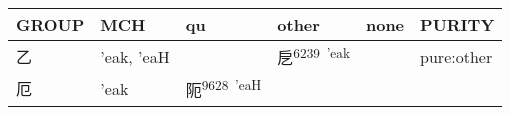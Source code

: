 \documentclass[14pt,a4paper]{scrartcl}
\begin{document}
\begin{longtable}[c]{@{}llllll@{}}
\toprule
\begin{minipage}[b]{0.14\columnwidth}\raggedright\strut
GROUP
\strut\end{minipage} &
\begin{minipage}[b]{0.14\columnwidth}\raggedright\strut
MCH
\strut\end{minipage} &
\begin{minipage}[b]{0.14\columnwidth}\raggedright\strut
qu
\strut\end{minipage} &
\begin{minipage}[b]{0.14\columnwidth}\raggedright\strut
other
\strut\end{minipage} &
\begin{minipage}[b]{0.14\columnwidth}\raggedright\strut
none
\strut\end{minipage} &
\begin{minipage}[b]{0.14\columnwidth}\raggedright\strut
PURITY
\strut\end{minipage}\tabularnewline
\midrule
\endhead
\begin{minipage}[t]{0.14\columnwidth}\raggedright\strut
乙
\strut\end{minipage} &
\begin{minipage}[t]{0.14\columnwidth}\raggedright\strut
'eak, 'eaH
\strut\end{minipage} &
\begin{minipage}[t]{0.14\columnwidth}\raggedright\strut
\strut\end{minipage} &
\begin{minipage}[t]{0.14\columnwidth}\raggedright\strut
戹\textsuperscript{6239~'eak}
\strut\end{minipage} &
\begin{minipage}[t]{0.14\columnwidth}\raggedright\strut
\strut\end{minipage} &
\begin{minipage}[t]{0.14\columnwidth}\raggedright\strut
pure:other
\strut\end{minipage}\tabularnewline
\begin{minipage}[t]{0.14\columnwidth}\raggedright\strut
厄
\strut\end{minipage} &
\begin{minipage}[t]{0.14\columnwidth}\raggedright\strut
'eak
\strut\end{minipage} &
\begin{minipage}[t]{0.14\columnwidth}\raggedright\strut
阨\textsuperscript{9628~'eaH}
\strut\end{minipage} &

\end{longtable}
\end{document}

